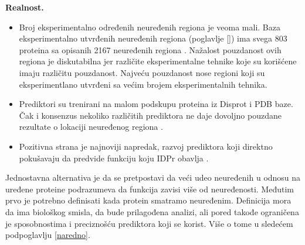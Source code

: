 \textbf{Realnost.} 
\begin{itemize}
  \item Broj eksperimentalno određenih neuređenih regiona je veoma mali.
    Baza eksperimentalno utvrđenih neuređenih regiona  (poglavlje \ref{}) ima
    svega 803 proteina sa opisanih 2167 neuređenih regiona \parencite{disprot7}.
    Nažalost pouzdanost ovih regiona je diskutabilna jer različite
    eksperimentalne tehnike koje su korišćene imaju različitu pouzdanost.
    Najveću pouzdanost nose regioni koji su eksperimentlano utvrđeni sa 
    većim brojem eksperimentalnih tehnika.
  \item Prediktori su trenirani na malom podskupu proteina iz Disprot i PDB  baze.
    Čak i konsenzus nekoliko različitih prediktora ne daje dovoljno pouzdane
    rezultate o lokaciji neuređenog regiona \parencite{Mitic}.
  \item 
    Pozitivna strana je najnoviji napredak, razvoj prediktora koji direktno
    pokušavaju da predvide funkciju koju IDPr obavlja \parencite{meng_c20017}.

\end{itemize}

Jednostavna alternativa je da se pretpostavi da veći udeo neuređenih u odnosu
na uređene proteine podrazumeva da funkcija zavisi više od neuređenosti. 
Međutim prvo je potrebno definisati kada protein smatramo
neuređenim.  Definicija mora da ima biološkog smisla, da bude prilagođena
analizi, ali pored takođe ograničena je sposobnostima i preciznošću prediktora
koji se korist.  Više o tome u sledećem podpoglavlju \ref{naredno}.

